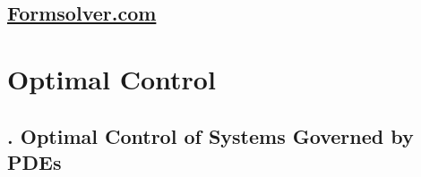 \documentclass[oneside]{book}
\numberwithin{equation}{section}
\begin{document}

\chapter{\href{formsolver.com}{Formsolver.com}}


\part{Optimal Control}

\chapter{\cite{Lions1971}. Optimal Control of Systems Governed by PDEs}
\end{document}
